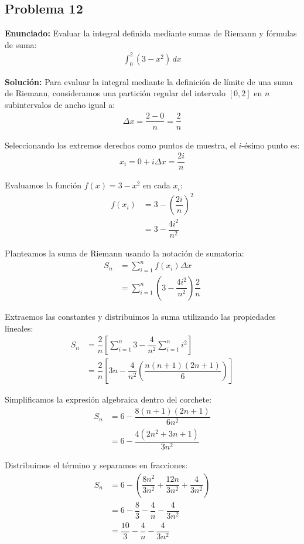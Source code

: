 \subsection*{Problema 12}
\textbf{Enunciado:} Evaluar la integral definida mediante sumas de Riemann y fórmulas de suma:
\begin{align*}
\int_{0}^{2} (3 - x^2) \, dx
\end{align*}

\textbf{Solución:}
Para evaluar la integral mediante la definición de límite de una suma de Riemann, consideramos una partición regular del intervalo $[0, 2]$ en $n$ subintervalos de ancho igual a:
\begin{align*}
\Delta x = \dfrac{2 - 0}{n} = \dfrac{2}{n}
\end{align*}

Seleccionando los extremos derechos como puntos de muestra, el $i$-ésimo punto es:
\begin{align*}
x_i = 0 + i\Delta x = \dfrac{2i}{n}
\end{align*}

Evaluamos la función $f(x) = 3 - x^2$ en cada $x_i$:
\begin{align*}
f(x_i) &= 3 - \left(\dfrac{2i}{n}\right)^2 \\
&= 3 - \dfrac{4i^2}{n^2}
\end{align*}

Planteamos la suma de Riemann usando la notación de sumatoria:
\begin{align*}
S_n &= \sum_{i=1}^{n} f(x_i) \Delta x \\
&= \sum_{i=1}^{n} \left(3 - \dfrac{4i^2}{n^2}\right) \dfrac{2}{n}
\end{align*}

Extraemos las constantes y distribuimos la suma utilizando las propiedades lineales:
\begin{align*}
S_n &= \dfrac{2}{n} \left[ \sum_{i=1}^{n} 3 - \dfrac{4}{n^2} \sum_{i=1}^{n} i^2 \right] \\
&= \dfrac{2}{n} \left[ 3n - \dfrac{4}{n^2} \left( \dfrac{n(n+1)(2n+1)}{6} \right) \right]
\end{align*}

Simplificamos la expresión algebraica dentro del corchete:
\begin{align*}
S_n &= 6 - \dfrac{8(n+1)(2n+1)}{6n^2} \\
&= 6 - \dfrac{4(2n^2 + 3n + 1)}{3n^2}
\end{align*}

Distribuimos el término y separamos en fracciones:
\begin{align*}
S_n &= 6 - \left(\dfrac{8n^2}{3n^2} + \dfrac{12n}{3n^2} + \dfrac{4}{3n^2}\right) \\
&= 6 - \dfrac{8}{3} - \dfrac{4}{n} - \dfrac{4}{3n^2} \\
&= \dfrac{10}{3} - \dfrac{4}{n} - \dfrac{4}{3n^2}
\end{align*}

